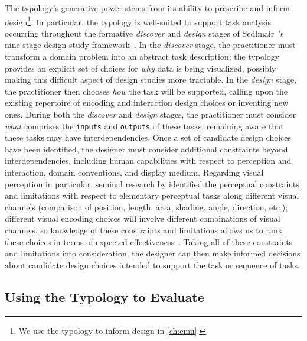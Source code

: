 The typology's generative power stems from its ability to prescribe and inform design\footnote{We use the typology to inform design in \autoref{ch:emu}.}.
In particular, the typology is well-suited to support task analysis occurring throughout the formative {\it discover} and {\it design} stages of Sedlmair~\etal's nine-stage design study framework~\cite{Sedlmair2012}.
In the {\it discover} stage, the practitioner must transform a domain problem into an abstract task description; the typology provides an explicit set of choices for {\it why} data is being visualized, possibly making this difficult aspect of design studies more tractable.
In the {\it design} stage, the practitioner then chooses {\it how} the task will be supported, calling upon the existing repertoire of encoding and interaction design choices or inventing new ones.
During both the {\it discover} and {\it design} stages, the practitioner must consider {\it what} comprises the {\tt inputs} and {\tt outputs} of these tasks, remaining aware that these tasks may have interdependencies.
Once a set of candidate design choices have been identified, the designer must consider additional constraints beyond interdependencies, including human capabilities with respect to perception and interaction, domain conventions, and display medium.
Regarding visual perception in particular, seminal research by \citet{Cleveland1984} identified the perceptual constraints and limitations with respect to elementary perceptual tasks along different visual channels (\eg comparison of position, length, area, shading, angle, direction, etc.); different visual encoding choices will involve different combinations of visual channels, so knowledge of these constraints and limitations allows us to rank these choices in terms of expected effectiveness~\cite{Mackinlay1986}.
Taking all of these constraints and limitations into consideration, the designer can then make informed decisions about candidate design choices intended to support the task or sequence of tasks.


\subsection{Using the Typology to Evaluate}
\label{typology:discussion:evaluate}


